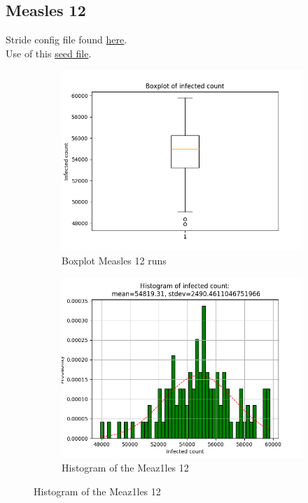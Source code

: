 \documentclass[a4paper]{article}
\begin{document}
\subsection{Measles 12}
Stride config file found \href{https://github.com/RobbeHeirman/Config1s/blob/master/config/run_random-geopop_nolog-measles.xml}{here}.\\
Use of this \href{https://github.com/RobbeHeirman/Configs/blob/master/100-random.txt}{seed file}.
\\

\begin{figure}[H]
\centering
\begin{subfigure}{.5\textwidth}
  \centering
  \includegraphics[width=1\linewidth]{Measles_12/Measles_12-boxplot.png}
  \caption{Boxplot Measles 12 runs }
  \label{fig:Boxplot_Measles_12}
\end{subfigure}%
\begin{subfigure}{.5\textwidth}
  \centering
  \includegraphics[width=1\linewidth]
  {Measles_12/Measles_12-histogram.png}
  \caption{Histogram of the Meaz1les 12}
  \label{fig:Histogram_Meazles_12}
\end{subfigure}


\end{figure}
\end{document}
